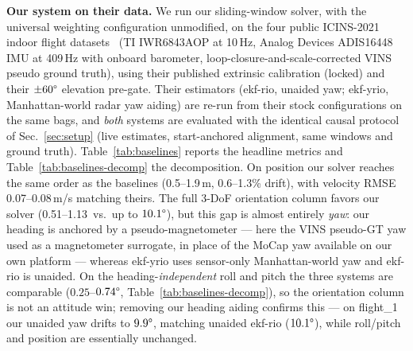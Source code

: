 \documentclass[conference]{IEEEtran}
\begin{document}
\textbf{Our system on their data.}  We run our sliding-window solver,
with the universal weighting configuration unmodified, on the four
public ICINS-2021 indoor flight datasets~\cite{doer2021yrio}
(TI IWR6843AOP at 10\,Hz, Analog Devices ADIS16448 IMU at 409\,Hz with
onboard barometer, loop-closure-and-scale-corrected VINS pseudo ground
truth), using their published extrinsic calibration (locked) and
their $\pm 60\degree$ elevation pre-gate.  Their estimators
(\mbox{ekf-rio}, unaided yaw; \mbox{ekf-yrio}, Manhattan-world radar
yaw aiding) are re-run from their stock configurations on the same
bags, and \emph{both} systems are evaluated with the identical causal
protocol of Sec.~\ref{sec:setup} (live estimates, start-anchored
alignment, same windows and ground truth).
Table~\ref{tab:baselines} reports the headline metrics and
Table~\ref{tab:baselines-decomp} the decomposition.  On position our
solver reaches the same order as the baselines (0.5--1.9\,m,
0.6--1.3\% drift), with velocity RMSE 0.07--0.08\,m/s matching theirs.
The full 3-DoF orientation column favors our solver
(0.51--1.13\degree\ vs.\ up to $10.1\degree$), but this gap is almost
entirely \emph{yaw}: our heading is anchored by a pseudo-magnetometer
--- here the VINS pseudo-GT yaw used as a magnetometer surrogate, in
place of the MoCap yaw available on our own platform --- whereas
ekf-yrio uses sensor-only Manhattan-world yaw and ekf-rio is unaided.
On the heading-\emph{independent} roll and pitch the three systems are
comparable ($0.25$--$0.74\degree$, Table~\ref{tab:baselines-decomp}),
so the orientation column is not an attitude win; removing our heading
aiding confirms this --- on flight\_1 our unaided yaw drifts to
$9.9\degree$, matching unaided ekf-rio ($10.1\degree$), while roll/pitch
and position are essentially unchanged.
\end{document}
